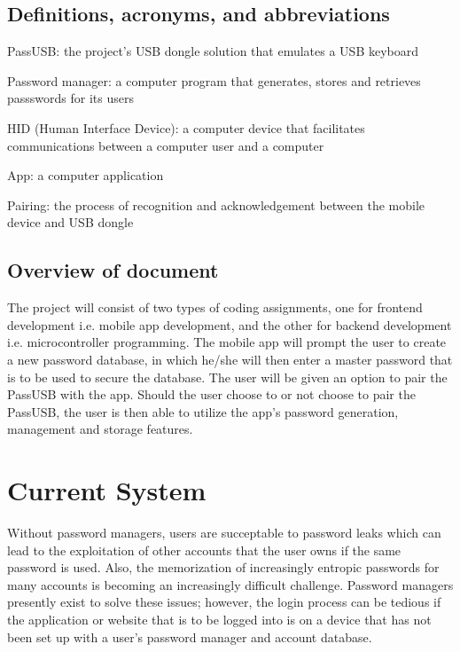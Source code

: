 \documentclass[stu]{apa7}
\begin{document}
\subsection{Definitions, acronyms, and abbreviations}

\begin{APAitemize}
  \item PassUSB: the project's USB dongle solution that emulates a USB keyboard
  \item Password manager: a computer program that generates, stores and retrieves passswords for its users
  \item HID (Human Interface Device): a computer device that facilitates communications between a computer user and a computer 
  \item App: a computer application
  \item Pairing: the process of recognition and acknowledgement between the mobile device and USB dongle
\end{APAitemize}

\subsection{Overview of document}
The project will consist of two types of coding assignments, one for frontend development i.e. mobile app development, and the other for backend development i.e. microcontroller programming. The mobile app will prompt the user to create a new password database, in which he/she will then enter a master password that is to be used to secure the database. The user will be given an option to pair the PassUSB with the app. Should the user choose to or not choose to pair the PassUSB, the user is then able to utilize the app's password generation, management and storage features.

\section{Current System}
Without password managers, users are succeptable to password leaks which can lead to the exploitation of other accounts that the user owns if the same password is used. Also, the memorization of increasingly entropic passwords for many accounts is becoming an increasingly difficult challenge. Password managers presently exist to solve these issues; however, the login process can be tedious if the application or website that is to be logged into is on a device that has not been set up with a user's password manager and account database.
\end{document}

